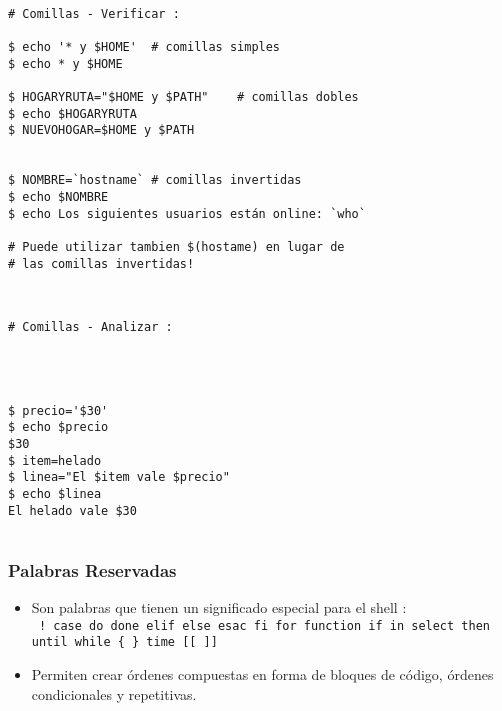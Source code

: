\documentclass{beamer}
\begin{document}
\begin{Verbatim}

# Comillas - Verificar : 

$ echo '* y $HOME'	# comillas simples
$ echo * y $HOME

$ HOGARYRUTA="$HOME y $PATH"	# comillas dobles
$ echo $HOGARYRUTA
$ NUEVOHOGAR=$HOME y $PATH


$ NOMBRE=`hostname`	# comillas invertidas
$ echo $NOMBRE
$ echo Los siguientes usuarios están online: `who` 

# Puede utilizar tambien $(hostame) en lugar de
# las comillas invertidas!


\end{Verbatim}


\begin{Verbatim}

# Comillas - Analizar :




$ precio='$30'
$ echo $precio 
$30 
$ item=helado 
$ linea="El $item vale $precio" 
$ echo $linea
El helado vale $30


\end{Verbatim}




\begin{frame}
\frametitle{Palabras Reservadas}
 \begin{itemize}
       \item Son palabras que  tienen  un  significado  especial
       para  el  shell :\\

\texttt{       ! case  do done elif else esac fi for function if in select then  until while \{ \} time [[ ]]}\\

\item Permiten crear órdenes compuestas en forma de bloques de código, órdenes condicionales y repetitivas.
\end{itemize}
\end{frame}
\end{document}
